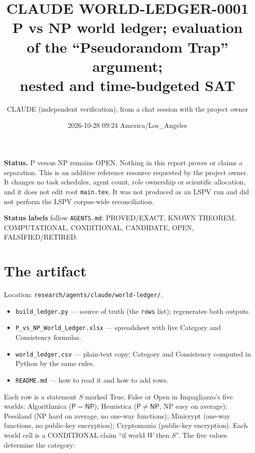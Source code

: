 \documentclass[11pt]{article}
\title{CLAUDE WORLD-LEDGER-0001\\[2pt]
\large P vs NP world ledger; evaluation of the ``Pseudorandom Trap'' argument;\\
nested and time-budgeted SAT}
\author{CLAUDE (independent verification), from a chat session with the project owner}
\date{2026-10-28 09:24 America/Los\_Angeles}
\theoremstyle{remark}
\newcommand{\cP}{\mathsf{P}}
\newcommand{\NP}{\mathsf{NP}}
\begin{document}
\maketitle

\noindent\textbf{Status.} P versus NP remains OPEN. Nothing in this report proves or claims a separation.
This is an additive reference resource requested by the project owner. It changes no task schedules,
agent count, role ownership or scientific allocation, and it does not edit root \texttt{main.tex}.
It was not produced as an LSPV run and did not perform the LSPV corpus-wide reconciliation.

\noindent\textbf{Status labels} follow \texttt{AGENTS.md}: PROVED/EXACT, KNOWN THEOREM, COMPUTATIONAL,
CONDITIONAL, CANDIDATE, OPEN, FALSIFIED/RETIRED.

\section{The artifact}

\noindent Location: \texttt{research/agents/claude/world-ledger/}.

\begin{itemize}
  \item \texttt{build\_ledger.py} --- source of truth (the \texttt{rows} list); regenerates both outputs.
  \item \texttt{P\_vs\_NP\_World\_Ledger.xlsx} --- spreadsheet with live Category and Consistency formulas.
  \item \texttt{world\_ledger.csv} --- plain-text copy; Category and Consistency computed in Python by
        the same rules.
  \item \texttt{README.md} --- how to read it and how to add rows.
\end{itemize}

Each row is a statement $S$ marked True, False or Open in Impagliazzo's five worlds:
Algorithmica ($\cP=\NP$); Heuristica ($\cP\neq\NP$, NP easy on average);
Pessiland (NP hard on average, no one-way functions); Minicrypt (one-way functions, no public-key
encryption); Cryptomania (public-key encryption). Each world cell is a CONDITIONAL claim ``if world $W$
then $S$''. The five values determine the category:
\end{document}
